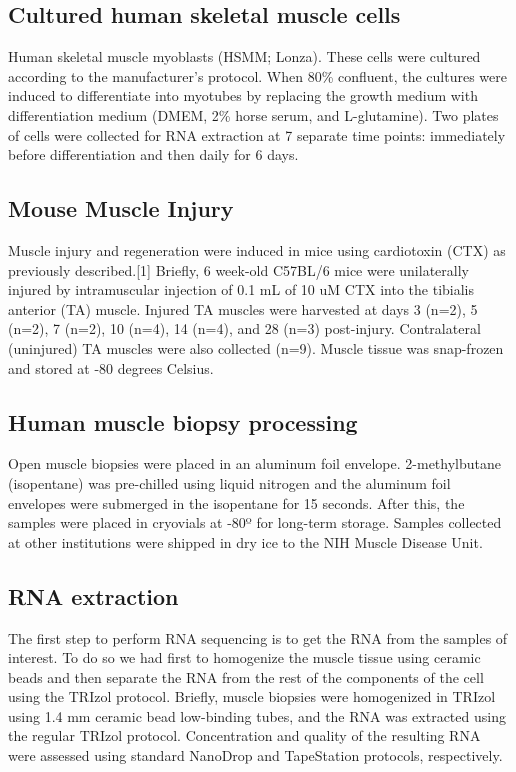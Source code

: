 \subsection{Cultured human skeletal muscle cells}
Human skeletal muscle myoblasts (HSMM; Lonza). These cells were cultured according to the manufacturer’s protocol. When 80\% confluent, the cultures were induced to differentiate into myotubes by replacing the growth medium with differentiation medium (DMEM, 2\% horse serum, and L-glutamine).  Two plates of cells were collected for RNA extraction at 7 separate time points: immediately before differentiation and then daily for 6 days.

\subsection{Mouse Muscle Injury}
Muscle injury and regeneration were induced in mice using cardiotoxin (CTX) as previously described.[1] Briefly, 6 week-old C57BL/6 mice were unilaterally injured by intramuscular injection of 0.1 mL of 10 uM CTX into the tibialis anterior (TA) muscle. Injured TA muscles were harvested at days 3 (n=2), 5 (n=2), 7 (n=2), 10 (n=4), 14 (n=4), and 28 (n=3) post-injury. Contralateral (uninjured) TA muscles were also collected (n=9). Muscle tissue was snap-frozen and stored at -80 degrees Celsius.

\subsection{Human muscle biopsy processing}
Open muscle biopsies were placed in an aluminum foil envelope. 2-methylbutane (isopentane) was pre-chilled using liquid nitrogen and the aluminum foil envelopes were submerged in the isopentane for 15 seconds. After this, the samples were placed in cryovials at -80º for long-term storage. Samples collected at other institutions were shipped in dry ice to the NIH Muscle Disease Unit.

\subsection{RNA extraction}
The first step to perform RNA sequencing is to get the RNA from the samples of interest. To do so we had first to homogenize the muscle tissue using ceramic beads and then separate the RNA from the rest of the components of the cell using the TRIzol protocol. Briefly, muscle biopsies were homogenized in TRIzol using 1.4 mm ceramic bead low-binding tubes, and the RNA was extracted using the regular TRIzol protocol. Concentration and quality of the resulting RNA were assessed using standard NanoDrop and TapeStation protocols, respectively.

